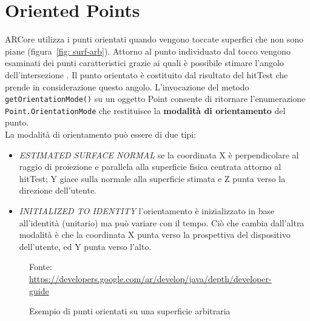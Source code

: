 \documentclass[crop=false, class=book]{standalone}
\begin{document}
		
	\chapter{Oriented Points}
	
		ARCore utilizza i punti orientati quando vengono toccate superfici che non sono piane (figura~\vref{fig: surf-arb}). Attorno al punto individuato dal tocco vengono esaminati dei punti caratteristici grazie ai quali è possibile stimare l'angolo dell'intersezione \cite{anna2018arcoredetection}. Il punto orientato è costituito dal risultato del hitTest che prende in considerazione questo angolo. 
		L'invocazione del metodo \verb|getOrientationMode()| su un oggetto Point consente di ritornare l'enumerazione \verb|Point.OrientationMode| che restituisce la \textbf{modalità di orientamento} del punto.\\
		La modalità di orientamento può essere di due tipi:
		\begin{itemize}
			\item \textit{ESTIMATED SURFACE NORMAL} se la coordinata X è perpendicolare al raggio di proiezione e parallela alla superficie fisica centrata attorno al hitTest; Y giace sulla normale alla superficie stimata e Z punta verso la direzione dell'utente.
			\item \emph{INITIALIZED TO IDENTITY} l'orientamento è inizializzato in base all'identità (unitario) ma può variare con il tempo. Ciò che cambia dall'altra modalità è che la coordinata X punta verso la prospettiva del dispositivo dell'utente, ed Y punta verso l'alto.
		\end{itemize}
		
				
		\begin{figure}[h]
				\centering
				{Fonte: \url{https://developers.google.com/ar/develop/java/depth/developer-guide}}
				\caption{Esempio di punti orientati su una superficie arbitraria}
				\label{fig: surf-arb}
		\end{figure}
		
		
\end{document}
